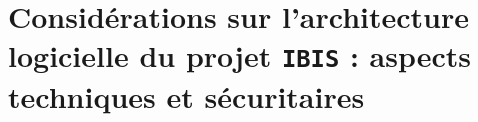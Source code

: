 \part{Considérations sur l'architecture logicielle du projet \texttt{IBIS} : aspects techniques et sécuritaires}\label{part:considerations-sur-l'architecture-logicielle-du-projet-texttt{ibis}-:-aspects-techniques-et-securitaires}
    
    
    
